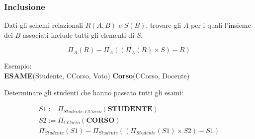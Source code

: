 \subsubsection{Inclusione}

Dati gli schemi relazionali $R(A,B)$ e $S(B)$, trovare gli $A$ per i quali l'insieme
dei $B$ associati include tutti gli elementi di $S$.

\begin{displaymath}
  \Pi_{A}(R) - \Pi_{A}((\Pi_{A}(R) \times S) - R)
\end{displaymath}

Esempio: \\

\noindent
\textbf{ESAME}(Studente, CCorso, Voto)
\textbf{Corso}(CCorso, Docente) \\
\noindent

Determinare gli studenti che hanno passato tutti gli esami:

\begin{gather*}
  S1 := \Pi_{Studente,CCorso}(\textbf{STUDENTE}) \\
  S2 := \Pi_{CCorso}(\textbf{CORSO}) \\
  \Pi_{Studente}(S1) - \Pi_{Studente}((\Pi_{Studente}(S1) \times S2) - S1)
\end{gather*}